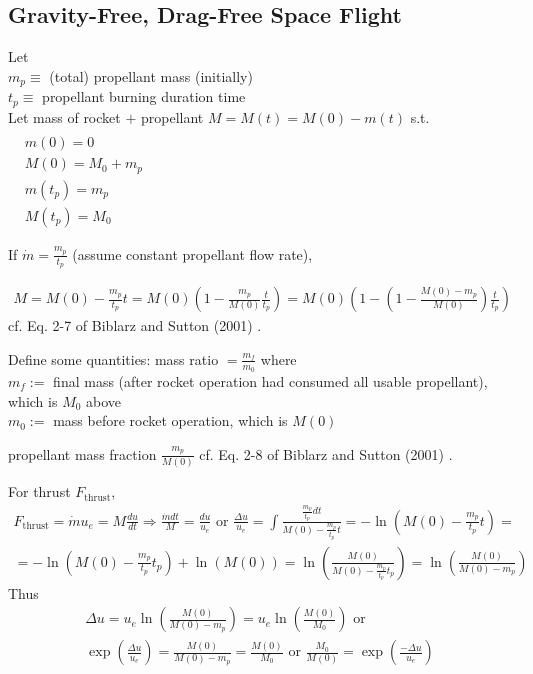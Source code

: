 \documentclass[10pt]{amsart}
\begin{document}
\begin{multicols*}{2}
\subsection{Gravity-Free, Drag-Free Space Flight}

Let \\
$m_p \equiv $ (total) propellant mass (initially) \\
$t_p \equiv$ propellant burning duration time  \\
Let mass of rocket $+$ propellant $M=M(t) = M(0) -m(t)$ s.t. $\begin{aligned} & \quad \\
  & m(0) = 0 \\
  & M(0) = M_0 +m_p \\
  & m(t_p) = m_p \\
  & M(t_p) = M_0 \end{aligned}$

If $\dot{m} = \frac{m_p}{t_p}$ (assume constant propellant flow rate),

\[
\begin{gathered}
  M=M(0) - \frac{m_p}{t_p}t = M(0)\left( 1 - \frac{m_p}{M(0)} \frac{t}{t_p} \right) = M(0) \left( 1 - \left( 1 - \frac{M(0) - m_p}{M(0) } \right) \frac{t}{t_p} \right)
\end{gathered}
\]
cf. Eq. 2-7 of Biblarz and Sutton (2001) \cite{GSuttonOBiblarz2001}.

Define some quantities:  mass ratio $= \frac{m_f}{m_0}$ where \\
$m_f := $ final mass (after rocket operation had consumed all usable propellant), which is $M_0$ above \\
$m_0 := $ mass before rocket operation, which is $M(0)$

propellant mass fraction $\frac{m_p}{M(0)}$ cf. Eq. 2-8 of Biblarz and Sutton (2001) \cite{GSuttonOBiblarz2001}.

For thrust $F_{\text{thrust}}$,
\[
\begin{gathered}
  F_{\text{thrust}} = \dot{m}u_e = M \frac{du}{dt} \Longrightarrow \frac{\dot{m}dt }{M} = \frac{du}{u_e} \text{ or } \frac{ \Delta u  }{u_e } = \int \frac{ \frac{m_p}{t_p} dt }{ M(0) - \frac{m_p}{t_p} t } = -\ln{ (M(0)- \frac{m_p}{t_p} t )} = \\
  = -\ln{ (M(0) - \frac{m_p}{t_p} t_p ) } + \ln{(M(0))} = \ln{ \left( \frac{M(0) }{M(0) - \frac{m_p}{t_p} t_p } \right) } = \ln{ \left( \frac{M(0)}{ M(0) - m_p } \right) }
\end{gathered}
\]
Thus
\[
\begin{gathered}
  \Delta u = u_e \ln{ \left( \frac{M(0)}{ M(0) - m_p } \right) } = u_e \ln{ \left( \frac{M(0)}{ M_0} \right) } \text{ or } \\
  \exp{ \left( \frac{ \Delta u }{ u_e } \right) }  = \frac{M(0)}{M(0) - m_p } = \frac{M(0)}{M_0} \text{ or } \frac{M_0}{M(0)} = \exp{ \left( \frac{ - \Delta u}{ u_e } \right) }
\end{gathered}
\]


\end{multicols*}
\end{document}
